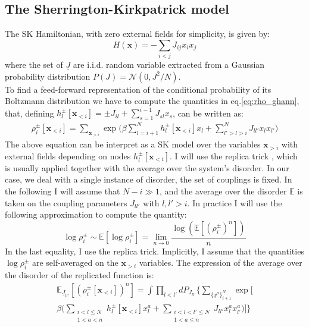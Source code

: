 \documentclass[aps,physrev,10pt,floatfix,reprint]{revtex4-2}
\begin{document}
\subsection{The Sherrington-Kirkpatrick model}
\label{sec:SK}
The SK Hamiltonian, with zero external fields for simplicity, is given by:
\begin{equation}
H\left(\mathbf{x}\right)=-\sum_{i<j}J_{ij}x_{i}x_{j}
\end{equation}
where the set of $\underline{J}$ are i.i.d. random variable extracted from a Gaussian probability distribution $P(J)= \mathcal{N}(0, J^2/N)$. \\
To find a feed-forward representation of the conditional probability of its Boltzmann distribution we have to compute the quantities in eq.\ref{eq:rho_ghann}, that, defining $h_l^{\pm}[\mathbf{x}_{<i}] =\pm J_{il} + \sum_{s=1}^{i-1} J_{sl} x_s$, can be written as:
\begin{align*}
    \rho_i^{\pm} [\mathbf{x}_{<i}]  = \sum_{\mathbf{x}_{>i}}  \exp \bigg(
    \beta\sum_{l=i+1}^{N} h_l^{\pm}[\mathbf{x}_{<i}] x_l
    + \sum_{l'>l>i}^{N} J_{ll'} x_l x_{l'} \bigg)
\end{align*}
The above equation can be interpret as a SK model over the variables $\mathbf{x}_{>i}$ with external fields depending on nodes $h_l^{\pm}[\mathbf{x}_{<i}]$. 
I will use the replica trick \cite{10.1142/0271}, which is usually applied together with the average over the system's disorder. In our case, we deal with a single instance of disorder, the set of couplings is fixed. In the following I will assume that $N-i \gg 1$, and the average over the disorder $\mathbb{E}$ is taken on the coupling parameters $J_{ll'}$ with $l,l'>i$. In practice I will use the following approximation to compute the quantity:
\[
\log\rho_i^{\pm} \sim \mathbb{E}\left[  \log\rho_i^{\pm} \right] = \lim_{n\rightarrow 0} \frac{  \log(\mathbb{E}\left[(\rho_i^{\pm})^n \right])}{n}
\]
In the last equality, I use the replica trick. 
Implicitly, I assume that the quantities $\log\rho_i^{\pm}$ are self-averaged on the $\mathbf{x}_{>i}$ variables.
 The expression of the average over the disorder of the replicated function is:
\begin{multline}
\mathbb{E}_{\underline{J}_{ll'}}\left[(\rho_i^{\pm}[\mathbf{x}_{<i}])^n \right]  = 
\int \prod_{l<l'} dP_{J_{ll'}} \bigg\{ 
\sum_{\{\underline{x}^{a}\}_{i+1}^N} \exp\bigg[\\ \beta \bigg( 
\sum_{\substack{i<l \le N\\ 1<a<n}}h_l^{\pm}[\mathbf{x}_{<i}] x_l^{a} + 
\sum_{\substack{i < l< l' \le N\\ 1<a \le n}} J_{ll'} x_l^{a} x_{l'}^{a}
\bigg)  \bigg] 
\bigg\}
\end{multline}
\end{document}
